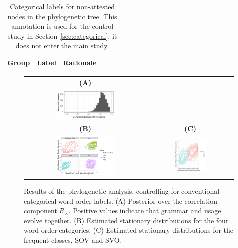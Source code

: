 \documentclass[11pt,a4paper]{article}
\begin{document}
\begin{table}
\begin{tabular}{llp{}lll}
\hline
Group & Label & Rationale \\ \hline

\hline
\end{tabular}
\caption{Categorical labels for non-attested nodes in the phylogenetic tree.  This annotation is used for the control study in Section~\ref{sec:categorical}; it does not enter the main study.}
\label{tab:interior}
\end{table}

\begin{figure}
    \centering
	\begin{tabular}{cc}
		\textbf{(A)} \\
    \includegraphics[width=0.5\textwidth]{../change/ornuhl-binom/categorical_order_gamma/fits/corr_sigma.pdf}
		\\
		\textbf{(B)} & \textbf{(C)} \\
		\includegraphics[width=0.5\textwidth]{../change/ornuhl-binom/categorical_order_gamma/fits/stationary_case_facet.pdf} &
    \includegraphics[width=0.4\textwidth]{../change/ornuhl-binom/categorical_order_gamma/fits/stationary_case_svo_sov.pdf}
	\end{tabular}
	\caption{Results of the phylogenetic analysis, controlling for conventional categorical word order labels. (A) Posterior over the correlation component $R_\Sigma$. Positive values indicate that grammar and usage evolve together. (B) Estimated stationary distributions for the four word order categories. (C) Estimated stationary distributions for the frequent classes, SOV and SVO.}
    \label{fig:langs-categorical}
\end{figure}
\end{document}
